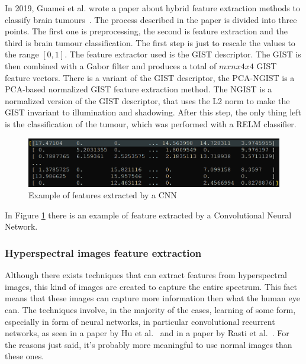 \documentclass[conference]{IEEEtran}
\begin{document}
					\noindent In 2019, Guamei et al. wrote a paper about hybrid feature extraction methods to classify brain tumours~\cite{gumaei2019hybrid}. The process described in the paper is divided into three points. The 
					first one is preprocessing, the second is feature extraction and the third is brain tumour classification. The first step is just to rescale the values to the range $[0,1]$. The feature extractor 
					used is the GIST descriptor. The GIST is then combined with a Gabor filter and produces a total of $mxnx4x4$ GIST feature vectors. There is a variant of the GIST descriptor, the 
					PCA-NGIST is a PCA-based normalized GIST feature extraction method. The NGIST is a normalized version of the GIST descriptor, that uses the L2 norm to make the GIST invariant to illumination and shadowing. 
					After this step, the only thing left is the classification of the tumour, which was performed with a RELM classifier. 
					
					\begin{figure}[!ht]
						\centerline{\includegraphics[width=\linewidth]{imgs/cnn_features.png}}
						\caption{Example of features extracted by a CNN}
						\label{fig:4}
					\end{figure}	
					
					\noindent In Figure \ref{fig:4} there is an example of feature extracted by a Convolutional Neural Network. 
					
				\subsubsection{Hyperspectral images feature extraction}
					
					Although there exists techniques that can extract features from hyperspectral images, this kind of images are created to capture the entire spectrum. This fact means that these images can capture 
					more information then what the human eye can. The techniques involve, in the majority of the cases, learning of some form, especially in form of neural networks, in particular convolutional recurrent 
					networks, as seen in a paper by Hu et al.~\cite{hu2020spatial} and in a paper by Rasti et al.~\cite{rasti2020feature}. For the reasons just said, it's probably more meaningful to use normal 
					images than these ones.
			
\end{document}
